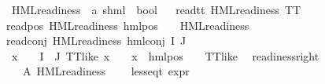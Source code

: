 \begin{isabellebody}
\ HML{\isacharunderscore}{\kern0pt}readiness\ {\isacharcolon}{\kern0pt}{\isacharcolon}{\kern0pt}\ {\isachardoublequoteopen}{\isacharparenleft}{\kern0pt}{\isacharprime}{\kern0pt}a{\isacharcomma}{\kern0pt}\ {\isacharprime}{\kern0pt}s{\isacharparenright}{\kern0pt}hml\ {\isasymRightarrow}\ bool{\isachardoublequoteclose}\isanewline
\ \ \isanewline
read{\isacharunderscore}{\kern0pt}tt{\isacharcolon}{\kern0pt}\ {\isachardoublequoteopen}HML{\isacharunderscore}{\kern0pt}readiness\ TT{\isachardoublequoteclose}\ {\isacharbar}{\kern0pt}\isanewline
read{\isacharunderscore}{\kern0pt}pos{\isacharcolon}{\kern0pt}\ {\isachardoublequoteopen}HML{\isacharunderscore}{\kern0pt}readiness\ {\isacharparenleft}{\kern0pt}hml{\isacharunderscore}{\kern0pt}pos\ {\isasymalpha}\ {\isasymphi}{\isacharparenright}{\kern0pt}{\isachardoublequoteclose}\ \ {\isachardoublequoteopen}HML{\isacharunderscore}{\kern0pt}readiness\ {\isasymphi}{\isachardoublequoteclose}{\isacharbar}{\kern0pt}\isanewline
read{\isacharunderscore}{\kern0pt}conj{\isacharcolon}{\kern0pt}\ {\isachardoublequoteopen}HML{\isacharunderscore}{\kern0pt}readiness\ {\isacharparenleft}{\kern0pt}hml{\isacharunderscore}{\kern0pt}conj\ I\ J\ {\isasymPhi}{\isacharparenright}{\kern0pt}{\isachardoublequoteclose}\ \isanewline
{}\ {\isachardoublequoteopen}{\isacharparenleft}{\kern0pt}{\isasymforall}x\ {\isasymin}\ {\isacharparenleft}{\kern0pt}{\isasymPhi}\ {\isacharbackquote}{\kern0pt}\ {\isacharparenleft}{\kern0pt}I\ {\isasymunion}\ J{\isacharparenright}{\kern0pt}{\isacharparenright}{\kern0pt}{\isachardot}{\kern0pt}\ TT{\isacharunderscore}{\kern0pt}like\ x\ {\isasymor}\ {\isacharparenleft}{\kern0pt}{\isasymexists}{\isasymalpha}\ {\isasymchi}{\isachardot}{\kern0pt}\ x\ {\isacharequal}{\kern0pt}\ hml{\isacharunderscore}{\kern0pt}pos\ {\isasymalpha}\ {\isasymchi}\ {\isasymand}\ TT{\isacharunderscore}{\kern0pt}like\ {\isasymchi}{\isacharparenright}{\kern0pt}{\isacharparenright}{\kern0pt}{\isachardoublequoteclose}\isanewline
\isanewline
\isanewline
{}\isamarkupfalse%
\ readiness{\isacharunderscore}{\kern0pt}right{\isacharcolon}{\kern0pt}\isanewline
\ \ \ A{}{\isacharcolon}{\kern0pt}\ {\isachardoublequoteopen}HML{\isacharunderscore}{\kern0pt}readiness\ {\isasymphi}{\isachardoublequoteclose}\isanewline
\ \ \ {\isachardoublequoteopen}{\isacharparenleft}{\kern0pt}less{\isacharunderscore}{\kern0pt}eq{\isacharunderscore}{\kern0pt}t\ {\isacharparenleft}{\kern0pt}expr\ {\isasymphi}{\isacharparenright}{\kern0pt}\ {\isacharparenleft}{\kern0pt}{\isasyminfinity}{\isacharcomma}{\kern0pt}\ {}{\isacharcomma}{\kern0pt}\ {}{\isacharcomma}{\kern0pt}\ {}{\isacharcomma}{\kern0pt}\ {}{\isacharcomma}{\kern0pt}\ {}{\isacharparenright}{\kern0pt}{\isacharparenright}{\kern0pt}{\isachardoublequoteclose}\isanewline

\end{isabellebody}
